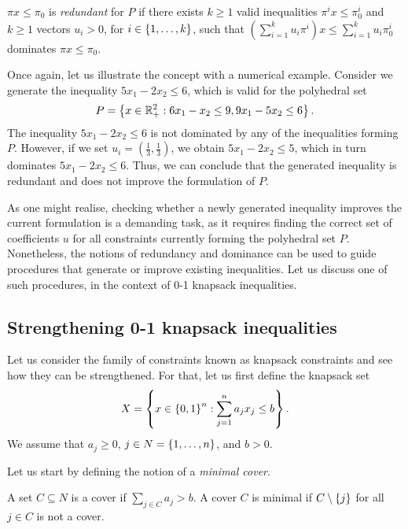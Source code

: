 \begin{definition}[Redundancy] \label{p1c10:def:redundancy}
	$\pi x \leq \pi_0$ is \emph{redundant} for $P$ if there exists $k \geq 1$ valid inequalities $\pi^i x \leq \pi_0^i$ and $k\geq 1$ vectors $u_i > 0$, for $i \in \left\{ 1,\dots, k \right \}$, such that $\left( \sum_{i=1}^k u_i\pi^i\right)x \leq \sum_{i=1}^ku_i\pi_0^i$ dominates $\pi x \leq \pi_0$.
\end{definition}

Once again, let us illustrate the concept with a numerical example. Consider we generate the inequality $5x_1 - 2x_2 \leq 6$, which is valid for the polyhedral set 
%
\begin{equation*}
	P = \left\{ x \in \mathbb{R}^2_+ : 6x_1 - x_2 \le 9, 9x_1 - 5x_2 \le 6 \right \}.
\end{equation*}
%
The inequality $5x_1 - 2x_2 \leq 6$ is not dominated by any of the inequalities forming $P$. However, if we set $u_i= (\frac{1}{3}, \frac{1}{3})$, we obtain $5x_1 - 2x_2 \leq 5$, which in turn dominates $5x_1 - 2x_2 \leq 6$. Thus, we can conclude that the generated inequality is redundant and does not improve the formulation of $P$.

As one might realise, checking whether a newly generated inequality improves the current formulation is a demanding task, as it requires finding the correct set of coefficients $u$ for all constraints currently forming the polyhedral set $P$. Nonetheless, the notions of redundancy and dominance can be used to guide procedures that generate or improve existing inequalities. Let us discuss one of such procedures, in the context of 0-1 knapsack inequalities.


\subsection{Strengthening 0-1 knapsack inequalities}

Let us consider the family of constraints known as knapsack constraints and see how they can be strengthened. For that, let us first define the knapsack set
%
\begin{equation*}
	X = \left\{ x \in \left\{ 0,1 \right \}^n : \sum_{j=1}^n a_jx_j \leq b \right \}.	
\end{equation*}
%
We assume that $a_j \geq 0$, $j \in N = \left\{ 1, \dots, n \right \}$, and $b > 0$.

Let us start by defining the notion of a \emph{minimal cover}.

\begin{definition}  \label{p1c10:def:minimal_cover}
	A set $C \subseteq N$ is a cover if $\sum_{j \in C} a_j > b$. A cover $C$ is minimal if $C \setminus \left\{ j \right \}$ for all $j \in C$ is not a cover.  
\end{definition} 

